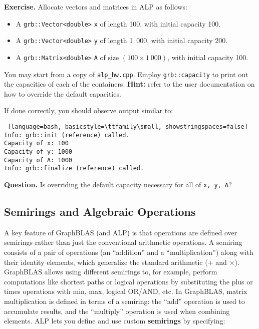 \noindent \textbf{Exercise.} Allocate vectors and matrices in ALP as follows:
\begin{itemize}
  \item A \texttt{grb::Vector<double>} \texttt{x} of length 100, with initial capacity 100.
  \item A \texttt{grb::Vector<double>} \texttt{y} of length 1\ 000, with initial capacity 200.
  \item A \texttt{grb::Matrix<double>} \texttt{A} of size $(100 \times 1\ 000)$, with initial capacity 100.
\end{itemize}
You may start from a copy of \texttt{alp\_hw.cpp}. Employ \texttt{grb::capacity} to print out the capacities of each of the containers. \textbf{Hint:} refer to the user documentation on how to override the default capacities.

If done correctly, you should observe output similar to:

\begin{lstlisting} [language=bash, basicstyle=\ttfamily\small, showstringspaces=false]
Info: grb::init (reference) called.
Capacity of x: 100
Capacity of y: 1000
Capacity of A: 1000
Info: grb::finalize (reference) called.
\end{lstlisting}

\noindent \textbf{Question.} Is overriding the default capacity necessary for all of \texttt{x, y, A}?

\subsection{Semirings and Algebraic Operations}

A key feature of GraphBLAS (and ALP) is that operations are defined over semirings rather than just the conventional arithmetic operations. A semiring consists of a pair of operations (an “addition” and a “multiplication”) along with their identity elements, which generalize the standard arithmetic (+ and $\times$). GraphBLAS allows using different semirings to, for example, perform computations like shortest paths or logical operations by substituting the plus or times operations with min, max, logical OR/AND, etc. In GraphBLAS, matrix multiplication is defined in terms of a semiring: the “add” operation is used to accumulate results, and the “multiply” operation is used when combining elements.
ALP lets you define and use custom \textbf{semirings} by specifying:


